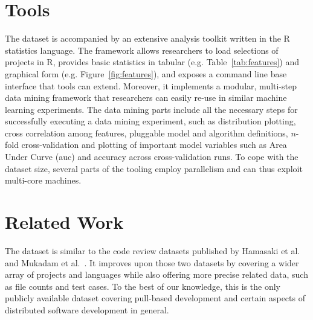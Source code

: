 \documentclass{sig-alternate}
\begin{document}
\section{Tools}

The \pullreqs dataset is accompanied by an extensive analysis toolkit written in
the R statistics language. The framework allows researchers to load selections
of projects in R, provides basic statistics in tabular (e.g.
Table~\ref{tab:features}) and graphical form (e.g. Figure~\ref{fig:features}),
and exposes a command line base interface that tools can extend. Moreover,
it implements a modular, multi-step data mining framework that researchers
can easily re-use in similar machine learning experiments. The data mining
parts include all the necessary steps for successfully executing a data mining
experiment, such as distribution plotting, cross correlation among features,
pluggable model and algorithm definitions, $n$-fold cross-validation and
plotting of important model variables such as Area Under Curve ({\sc auc}) and
accuracy across cross-validation runs. To cope with the \pullreqs dataset
size, several parts of the tooling employ parallelism and can thus exploit
multi-core machines.

%
%
%
%

\section{Related Work}
\label{sec:rel}

The \pullreqs dataset is similar to the code review datasets published by
Hamasaki et al.~\cite{Hamas13} and Mukadam et al.~\cite{Mukad13}.  It improves
upon those two datasets by covering a wider array of projects and languages
while also offering more precise related data, such as file counts and test
cases. To the best of our knowledge, this is the only publicly available
dataset covering pull-based development and certain aspects of distributed
software development in general.
\end{document}
